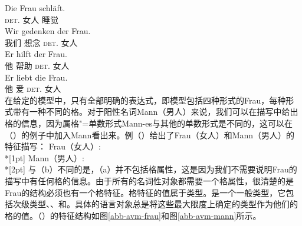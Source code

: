 \eal\settowidth{}
\ex 
\gll Die        Frau schläft. \\      
     \textsc{det}.\nom{} 女人 睡觉\\
\ex 
\gll Wir gedenken der Frau. \\ 
     我们 想念 \textsc{det}.\gen{} 女人\\
\ex 
\gll Er hilft der Frau.  \\    
     他 帮助 \textsc{det}.\dat{} 女人\\
\ex 
\gll Er liebt die Frau.   \\   
     他 爱 \textsc{det}.\acc{} 女人\\
\zl
在给定的模型中，只有全部明确的表达式，即模型包括四种形式的Frau，每种形式带有一种不同的格。对于阳性名词Mann（男人）来说，我们可以在描写中给出格的信息，因为属格"=单数形式Mann-es与其他的单数形式是不同的，这可以在（）的例子中加入Mann看出来。例（）给出了Frau（女人）和Mann（男人）的特征描写：
\eal
\ex\label{avm-frau}
Frau（女人）:\\*[1pt]
\ex\label{avm-mann}
Mann（男人）:\\*[2pt]
\zl
与（b）不同的是，（a）并不包括格属性，这是因为我们不需要说明Frau的描写中有任何格的信息。由于所有的名词性对象都需要一个格属性，很清楚的是Frau的结构必须也有一个格特征。格特征的值属于类型。是一个一般类型，它包括次级类型、、和。具体的语言对象总是将这些最大限度上确定的类型作为他们的格的值。（）的特征结构如图\ref{abb-avm-frau}和图\ref{abb-avm-mann}所示。
